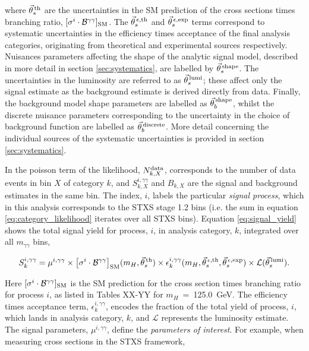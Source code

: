 \noindent
where $\vec{\theta}^{\,\rm{th}}_{s}$ are the uncertainties in the SM prediction of the cross sections times branching ratio, $[\sigma^i \cdot \mathcal{B}^{\gamma\gamma}]_{\rm{SM}}$. The $\vec{\theta}^{\,\epsilon,{\rm{th}}}_{s}$ and $\vec{\theta}^{\,\epsilon,{\rm{exp}}}_{s}$ terms correspond to systematic uncertainties in the efficiency times acceptance of the final analysis categories, originating from theoretical and experimental sources respectively. Nuisances parameters affecting the shape of the analytic signal model, described in more detail in section \ref{sec:systematics}, are labelled by $\vec{\theta}^{\,\rm{shape}}_{s}$. The uncertainties in the luminosity are referred to as $\vec{\theta}^{\,\rm{lumi}}_{s}$; these affect only the signal estimate as the background estimate is derived directly from data. Finally, the background model shape parameters are labelled as $\vec{\theta}^{\,\rm{shape}}_{b}$, whilst the discrete nuisance parameters corresponding to the uncertainty in the choice of background function are labelled as $\vec{\theta}^{\,\rm{discrete}}_{b}$. More detail concerning the individual sources of the systematic uncertainties is provided in section \ref{sec:systematics}.

In the poisson term of the likelihood, $N_{k,X}^{\rm{data}}$, corresponds to the number of data events in bin $X$ of category $k$, and $S_{k,X}^{i,\gamma\gamma}$ and $B_{k,X}$ are the signal and background estimates in the same bin. The index, $i$, labels the particular \textit{signal process}, which in this analysis corresponds to the STXS stage 1.2 bins (i.e. the sum in equation \ref{eq:category_likelihood} iterates over all STXS bins). Equation \ref{eq:signal_yield} shows the total signal yield for process, $i$, in analysis category, $k$, integrated over all $m_{\gamma\gamma}$ bins,

\begin{equation}\label{eq:signal_yield}
    S_k^{i,\gamma\gamma} = \mu^{i,\gamma\gamma} \times \big[\sigma^i \cdot \mathcal{B}^{\gamma\gamma} \big]_{\rm{SM}}(m_H,\vec{\theta}^{\,\rm{th}}_{s}) \times \epsilon^{i,\gamma\gamma}_k(m_H,\vec{\theta}^{\,\epsilon,{\rm{th}}}_{s}, \vec{\theta}^{\,\epsilon,{\rm{exp}}}_{s}) \times \mathcal{L}(\vec{\theta}^{\,\rm{lumi}}_{s}).
\end{equation}

\noindent
Here $[\sigma^i \cdot \mathcal{B}^{\gamma\gamma}]_{\rm{SM}}$ is the SM prediction for the cross section times branching ratio for process $i$, as listed in Tables XX-YY for $m_H$~=~125.0~GeV. The efficiency times acceptance term, $\epsilon^{i,\gamma\gamma}_k$, encodes the fraction of the total yield of process, $i$, which lands in analysis category, $k$, and $\mathcal{L}$ represents the luminosity estimate. The signal parameters, $\mu^{i,\gamma\gamma}$, define the \textit{parameters of interest}. For example, when measuring cross sections in the STXS framework,


